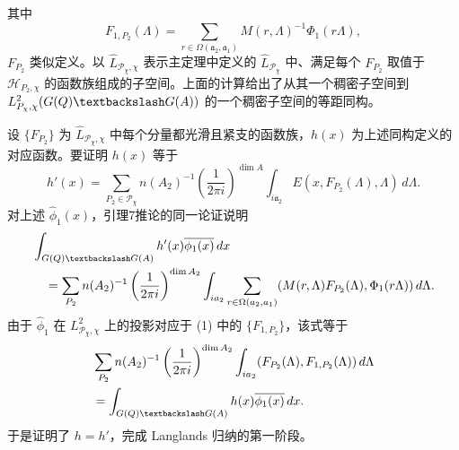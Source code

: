其中
\begin{equation}
 F_{1,P_2}(\Lambda)=\sum_{r\in\Omega(\mathfrak a_2,\mathfrak a_1)}
 M(r,\Lambda)^{-1}\Phi_1(r\Lambda),\tag{1}
\end{equation}
$F_{P_2}$ 类似定义。以 $\widehat L_{\mathcal P_\chi,\chi}$ 表示主定理中定义的 $\widehat L_{\mathcal P_\chi}$ 中、满足每个 $F_{P_2}$ 取值于 $\mathcal H_{P_2,\chi}$ 的函数族组成的子空间。上面的计算给出了从其一个稠密子空间到
$L_{\mathcal P_\chi,\chi}^2(G(\Q)\backslash G(A))$ 的一个稠密子空间的等距同构。

设 $\{F_{P_2}\}$ 为 $\widehat L_{\mathcal P_\chi,\chi}$ 中每个分量都光滑且紧支的函数族，$h(x)$ 为上述同构定义的对应函数。要证明 $h(x)$ 等于
\[
 h'(x)=\sum_{P_2\in\mathcal P_\chi}n(A_2)^{-1}
 \left(\frac1{2\pi i}\right)^{\dim A}
 \int_{i\mathfrak a_2}E(x,F_{P_2}(\Lambda),\Lambda)\,d\Lambda.
\]
对上述 $\widehat\phi_1(x)$，引理7推论的同一论证说明
\[
\begin{split}
 &\int_{G(\Q)\backslash G(A)}h'(x)\overline{\widehat\phi_1(x)}\,dx\\
 &\quad=\sum_{P_2}n(A_2)^{-1}\left(\frac1{2\pi i}\right)^{\dim A_2}
 \int_{i\mathfrak a_2}\sum_{r\in\Omega(\mathfrak a_2,\mathfrak a_1)}
 (M(r,\Lambda)F_{P_2}(\Lambda),\Phi_1(r\Lambda))\,d\Lambda.
\end{split}
\]
由于 $\widehat\phi_1$ 在 $L_{\mathcal P_\chi,\chi}^2$ 上的投影对应于 (1) 中的 $\{F_{1,P_2}\}$，该式等于
\[
\begin{split}
 &\sum_{P_2}n(A_2)^{-1}\left(\frac1{2\pi i}\right)^{\dim A_2}
 \int_{i\mathfrak a_2}(F_{P_2}(\Lambda),F_{1,P_2}(\Lambda))\,d\Lambda\\
 &=\int_{G(\Q)\backslash G(A)}h(x)\overline{\widehat\phi_1(x)}\,dx.
\end{split}
\]
于是证明了 $h=h'$，完成 Langlands 归纳的第一阶段。

